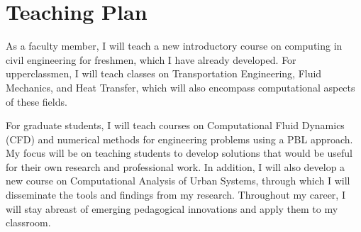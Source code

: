 \documentclass[12pt]{article}
\begin{document}
\section*{Teaching Plan}
As a faculty member, I will teach a new introductory course on computing in civil engineering for freshmen, which I have already developed. For upperclassmen, I will teach classes on Transportation Engineering, Fluid Mechanics, and Heat Transfer, which will also encompass computational aspects of these fields. 

For graduate students, I will teach courses on Computational Fluid Dynamics (CFD) and numerical methods for engineering problems using a PBL approach. My focus will be on teaching students to develop solutions that would be useful for their own research and professional work. In addition, I will also develop a new course on Computational Analysis of Urban Systems, through which I will disseminate the tools and findings from my research. Throughout my career, I will stay abreast of emerging pedagogical innovations and apply them to my classroom.
\end{document}
